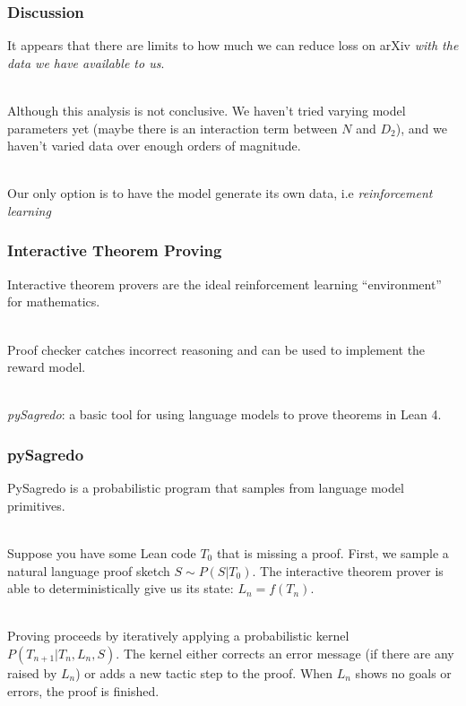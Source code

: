 \documentclass{beamer}
\begin{document}
\begin{frame}
\frametitle{Discussion}
It appears that there are limits to how much we can reduce loss on arXiv {\it with the data we have available to us}.\\~\

Although this analysis is not conclusive. We haven't tried varying model parameters yet (maybe there is an interaction term between $N$ and $D_2$), and we haven't varied data over enough orders of magnitude.\\~\

Our only option is to have the model generate its own data, i.e {\it reinforcement learning}
\end{frame}

\begin{frame}
\frametitle{Interactive Theorem Proving}
Interactive theorem provers are the ideal reinforcement learning ``environment'' for mathematics. \\~\

Proof checker catches incorrect reasoning and can be used to implement the reward model.\\~\

{\it pySagredo}: a basic tool for using language models to prove theorems in Lean 4.
\end{frame}

\begin{frame}
\frametitle{pySagredo}
PySagredo is a probabilistic program that samples from language model primitives. \\~\

Suppose you have some Lean code $T_0$ that is missing a proof. First, we sample a natural language proof sketch $S\sim P(S|T_0)$. The interactive theorem prover is able to deterministically give us its state: $L_n = f(T_n)$. \\~\

Proving proceeds by iteratively applying a probabilistic kernel $P(T_{n+1} | T_{n}, L_n, S)$. The kernel either corrects an error message (if there are any raised by $L_n$) or adds a new tactic step to the proof. When $L_n$ shows no goals or errors, the proof is finished.
\end{frame}
\end{document}

